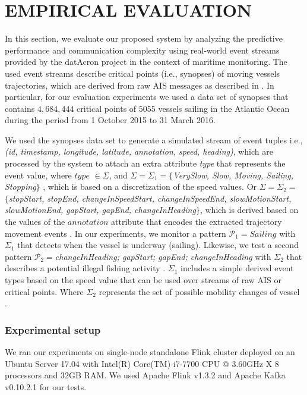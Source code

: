 \section{EMPIRICAL EVALUATION}
\label{sec:results}
In this section, we evaluate our proposed system by analyzing the predictive performance and communication complexity  using real-world event streams provided by the datAcron project in the context of maritime monitoring. The used event streams describe critical points (i.e., synopses) of moving vessels trajectories, which are derived from raw AIS messages as described in \cite{synopses1}. In particular, for our evaluation experiments we used a data set of synopses that contains $4,684,444$ critical points of $5055$ vessels sailing in the Atlantic Ocean during the period from 1 October 2015 to 31 March 2016.

\par We used the synopses data set to generate a simulated stream of event tuples  i.e., \textit{(id, timestamp, longitude, latitude, annotation, speed, heading)}, which are processed by the system to attach an extra attribute \textit{type} that represents the event value,  where $type$ $\in \Sigma$,  and $ \Sigma= \Sigma_1=$$\{$\textit{VerySlow, Slow, Moving,  Sailing, Stopping}$\}$ , which is based on a discretization of the speed values. Or $\Sigma=\Sigma_2=$ $\{$\textit{stopStart, stopEnd, changeInSpeedStart, changeInSpeedEnd,  slowMotionStart, slowMotionEnd, gapStart, gapEnd, changeInHeading}$\}$, which is derived based on the values of the $annotation$ attribute that encodes the extracted trajectory movement events \cite{synopses1}. In our experiments, we monitor a pattern $\mathcal{P}_1=Sailing$ with $\Sigma_1$ that detects when the vessel is underway (sailing). Likewise, we test a second pattern  $\mathcal{P}_2=$\textit{changeInHeading; gapStart; gapEnd; changeInHeading} with $\Sigma_2$ that describes a potential illegal fishing activity \cite{alevizos2017event}. $\Sigma_1$ includes a simple derived event types based on the speed value that can be used over streams of  raw AIS  or critical points.  Where  $\Sigma_2$ represents the set of possible mobility changes of vessel \cite{synopses1}. 


\subsubsection*{Experimental setup} We ran our experiments on single-node standalone Flink cluster deployed on an Ubuntu Server 17.04 with Intel(R) Core(TM) i7-7700 CPU @ 3.60GHz X 8 processors and 32GB RAM. We used Apache Flink v1.3.2 and Apache Kafka v0.10.2.1 for our tests.



